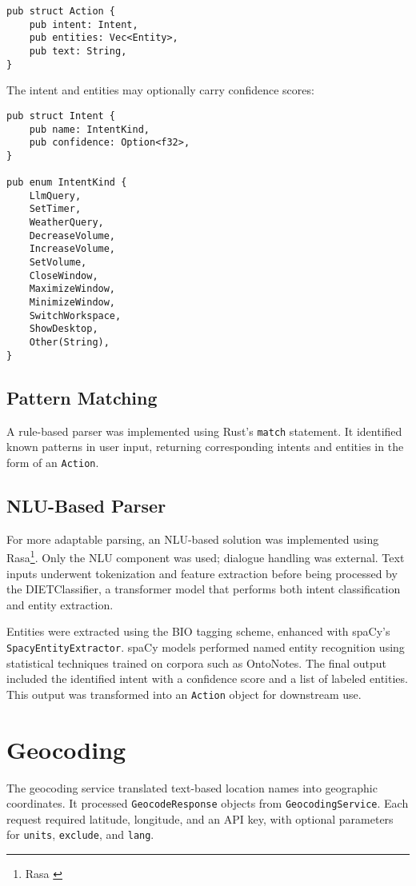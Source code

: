 \begin{verbatim}
pub struct Action {
    pub intent: Intent,
    pub entities: Vec<Entity>,
    pub text: String,
}
\end{verbatim}

The intent and entities may optionally carry confidence scores:

\begin{verbatim}
pub struct Intent {
    pub name: IntentKind,
    pub confidence: Option<f32>,
}

pub enum IntentKind {
    LlmQuery,
    SetTimer,
    WeatherQuery,
    DecreaseVolume,
    IncreaseVolume,
    SetVolume,
    CloseWindow,
    MaximizeWindow,
    MinimizeWindow,
    SwitchWorkspace,
    ShowDesktop,
    Other(String),
}
\end{verbatim}

\subsection{Pattern Matching}
A rule-based parser was implemented using Rust's \texttt{match} statement.
It identified known patterns in user input, returning corresponding intents and entities in the form of an \texttt{Action}.

\subsection{NLU-Based Parser}
For more adaptable parsing, an NLU-based solution was implemented using Rasa\footnote{Rasa \cite{rasa}}.
Only the NLU component was used; dialogue handling was external.
Text inputs underwent tokenization and feature extraction before being processed by the DIETClassifier,
a transformer model that performs both intent classification and entity extraction.

Entities were extracted using the BIO tagging scheme, enhanced with spaCy's \texttt{SpacyEntityExtractor}.
spaCy models performed named entity recognition using statistical techniques trained on corpora such as OntoNotes.
The final output included the identified intent with a confidence score and a list of labeled entities.
This output was transformed into an \texttt{Action} object for downstream use.

\section{Geocoding}
The geocoding service translated text-based location names into geographic coordinates.
It processed \texttt{GeocodeResponse} objects from \texttt{GeocodingService}.
Each request required latitude, longitude, and an API key, with optional parameters for \texttt{units}, \texttt{exclude}, and \texttt{lang}.

